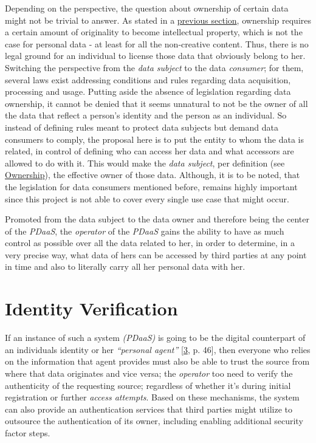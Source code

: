 \documentclass[12pt,english,a4paper,titlepage,cleardoublepage=empty,dottedtoc]{report}
\begin{document}
Depending on the perspective, the question about ownership of certain
data might not be trivial to answer. As stated in a
\protect\hyperlink{digital-identity-personal-data-and-ownership}{previous
section}, ownership requires a certain amount of originality to become
intellectual property, which is not the case for personal data - at
least for all the non-creative content. Thus, there is no legal ground
for an individual to license those data that obviously belong to her.
Switching the perspective from the \emph{data subject} to the data
\emph{consumer}; for them, several laws exist addressing conditions and
rules regarding data acquisition, processing and usage. Putting aside
the absence of legislation regarding data ownership, it cannot be denied
that it seems unnatural to not be the owner of all the data that reflect
a person's identity and the person as an individual. So instead of
defining rules meant to protect data subjects but demand data consumers
to comply, the proposal here is to put the entity to whom the data is
related, in control of defining who can access her data and what
accessors are allowed to do with it. This would make the \emph{data
subject}, per definition (see
\protect\hyperlink{def-ownership}{Ownership}), the effective owner of
those data. Although, it is to be noted, that the legislation for data
consumers mentioned before, remains highly important since this project
is not able to cover every single use case that might occur.

Promoted from the data subject to the data owner and therefore being the
center of the \emph{PDaaS}, the \emph{operator} of the \emph{PDaaS}
gains the ability to have as much control as possible over all the data
related to her, in order to determine, in a very precise way, what data
of hers can be accessed by third parties at any point in time and also
to literally carry all her personal data with her.

\section{Identity Verification}\label{identity-verification}

If an instance of such a system \emph{(PDaaS)} is going to be the
digital counterpart of an individuals identity or her \emph{``personal
agent''} {[}\protect\hyperlink{ref-book_2015_ethical-it-innovation}{3},
p. 46{]}, then everyone who relies on the information that agent
provides must also be able to trust the source from where that data
originates and vice versa; the \emph{operator} too need to verify the
authenticity of the requesting source; regardless of whether it's during
initial registration or further \emph{access attempts}. Based on these
mechanisms, the system can also provide an authentication services that
third parties might utilize to outsource the authentication of its
owner, including enabling additional security factor steps.
\end{document}
